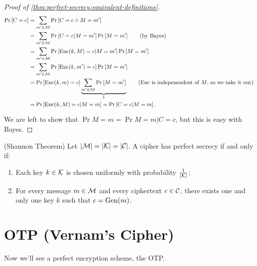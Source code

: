 \begin{proof}[Proof of \cref{thm:perfect-secrecy:equivalent-definitions}]
	\begin{align*}
		\Pr{C = c}
		& =
		\sum_{m' \in \M} \Pr{C = c \land M = m'}
		\\
		& = 
		\sum_{m' \in \M} \Pr{C = c | M = m'} \Pr{M = m'}
		\tag{by Bayes}
		\\
		& =
		\sum_{m' \in \M} \Pr{\GenericEnc(k,M) = c | M = m'} \Pr{M = m'}
		\\
		& =
		\sum_{m' \in \M} \Pr{\GenericEnc(k,m') = c} \Pr{M = m'}
		\\
		& =
		\Pr{\GenericEnc(k, m) = c} \underbrace{\sum_{m' \in \M} \Pr{M = m'}}_{1}
		\tag{$\GenericEnc$ is indepenendent of $M$, so we take it out}
		\\
		& =
		\Pr{\GenericEnc(k,M) = c | M = m} =
		\Pr{C = c | M = m}.
	\end{align*}
	We are left to show that $\Pr{M = m} = \Pr{M = m | C = c}$, but this is easy with Bayes.
\end{proof}


\begin{theorem}(Shannon Theorem)
	Let $|\mathcal{M}| = |\mathcal{K}| = |\mathcal{C}|$. A cipher has perfect secrecy if and only if:
	\begin{enumerate}[label=(\roman*)]
		\item Each key $k \in \mathcal{K}$ is chosen uniformly with probability $\frac{1}{|\mathcal{K}|}$;
		\item For every message $m \in \mathcal{M}$ and every ciphertext $c \in \mathcal{C}$, there exists one and only one key $k$ such that $c = \mathrm{Gen}(m)$.
	\end{enumerate}
\end{theorem}

\section{\acl{OTP} (Vernam's Cipher)}

Now we'll see a perfect encryption scheme, the \ac{OTP}.



